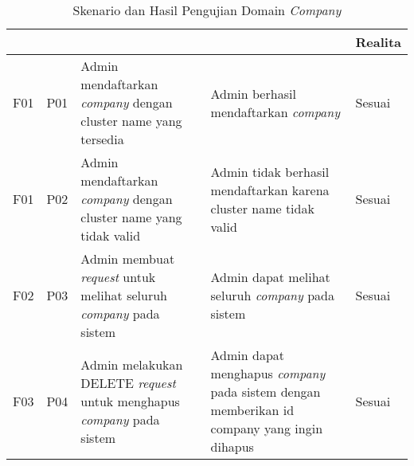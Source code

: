 \bgroup
\begin{table}[ht]
  \def\arraystretch{1.5}
  \caption{Skenario dan Hasil Pengujian Domain \textit{Company}}
  \label{tab:pengujian-domain-company}
  \centering
  \begin{tabular}{|p{2cm}|p{2cm}|p{4cm}|p{3cm}|p{2cm}|}
    \hline
    \centering{ID Fungsional} & \centering{ID Pengujian} & \centering{Skenario}                                                                 & \centering{Ekspektasi}                                                                             & Realita \\
    \hline
    F01                       & P01                      & Admin mendaftarkan \textit{company} dengan cluster name yang tersedia                & Admin berhasil mendaftarkan \textit{company}                                                       & Sesuai  \\
    \hline
    F01                       & P02                      & Admin mendaftarkan \textit{company} dengan cluster name yang tidak valid             & Admin tidak berhasil mendaftarkan karena cluster name tidak valid                                  & Sesuai  \\
    \hline
    F02                       & P03                      & Admin membuat \textit{request} untuk melihat seluruh \textit{company} pada sistem    & Admin dapat melihat seluruh \textit{company} pada sistem                                           & Sesuai  \\
    \hline
    F03                       & P04                      & Admin melakukan DELETE \textit{request} untuk menghapus \textit{company} pada sistem & Admin dapat menghapus \textit{company} pada sistem dengan memberikan id company yang ingin dihapus & Sesuai  \\
    \hline
  \end{tabular}
\end{table}
\egroup

\pagebreak

